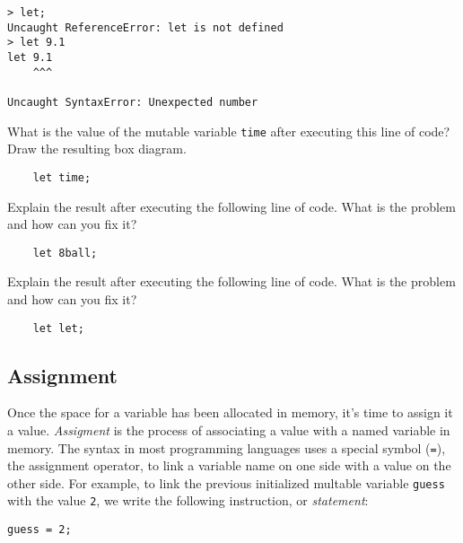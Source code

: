 \begin{lstlisting}[caption={\label{listing:intro-let-syntax-error}Several illegal uses of the keyword \texttt{let}.}]
> let;
Uncaught ReferenceError: let is not defined
> let 9.1
let 9.1
    ^^^

Uncaught SyntaxError: Unexpected number
\end{lstlisting}

\begin{question}
  What is the value of the mutable variable \texttt{time} after executing this line of code? Draw the resulting box diagram.
  \begin{lstlisting}
    let time;
  \end{lstlisting}
\end{question}

\begin{question}
  Explain the result after executing the following line of code. What is the problem and how can you fix it?
  \begin{lstlisting}
    let 8ball;
  \end{lstlisting}
\end{question}

\begin{question}
  Explain the result after executing the following line of code. What is the problem and how can you fix it?
  \begin{lstlisting}
    let let;
  \end{lstlisting}
\end{question}

\subsection{Assignment}
Once the space for a variable has been allocated in memory, it's time to assign it a value. \emph{Assigment} is the process of associating a value with a named variable in memory. The syntax in most programming languages uses a special symbol (\texttt{=}), the assignment operator, to link a variable name on one side with a value on the other side.  For example, to link the previous initialized multable variable \texttt{guess} with the value \texttt{2}, we write the following instruction, or \emph{statement}:

\begin{lstlisting}
guess = 2;
\end{lstlisting}

